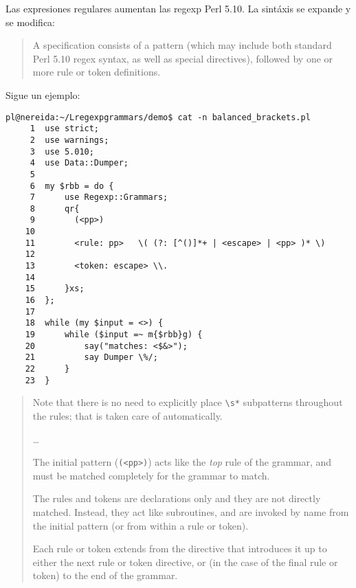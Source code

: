 
Las expresiones regulares \regexpg{} aumentan las regexp Perl 5.10. La sintáxis
se expande y se modifica:

\begin{it}\begin{quotation}
A \regexpg{} specification consists of a pattern (which may include both standard Perl 5.10 regex syntax, as well as special
 directives), followed by one or more rule or token definitions.
\end{quotation}\end{it}

Sigue un ejemplo:

\begin{verbatim}
pl@nereida:~/Lregexpgrammars/demo$ cat -n balanced_brackets.pl
     1  use strict;
     2  use warnings;
     3  use 5.010;
     4  use Data::Dumper;
     5
     6  my $rbb = do {
     7      use Regexp::Grammars;
     8      qr{
     9        (<pp>)
    10
    11        <rule: pp>   \( (?: [^()]*+ | <escape> | <pp> )* \)
    12
    13        <token: escape> \\.
    14
    15      }xs;
    16  };
    17
    18  while (my $input = <>) {
    19      while ($input =~ m{$rbb}g) {
    20          say("matches: <$&>");
    21          say Dumper \%/;
    22      }
    23  }
\end{verbatim}

\begin{it}\begin{quote}
Note that there is no need to explicitly place \verb"\s*" 
subpatterns throughout the rules; that is taken care of automatically.

\ldots

The initial pattern (\verb|(<pp>)|) acts like the \emph{top} rule of the grammar, and must
be matched completely for the grammar to match.

The rules and tokens are declarations only and they are not directly
matched.  Instead, they act like subroutines, and are invoked by name
from the initial pattern (or from within a rule or token).

Each rule or token extends from the directive that introduces it up to
either the next rule or token directive, or (in the case of the final
rule or token) to the end of the grammar.  

\end{quote}\end{it}

